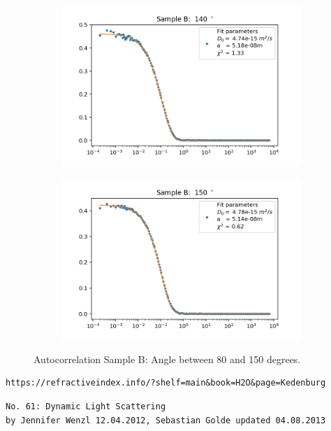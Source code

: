 \documentclass[]{article}
\begin{document}
\begin{figure}[!h]
\medskip
\begin{subfigure}{0.48\textwidth}
\includegraphics[width=\linewidth]{Plots/B/140.png}
\end{subfigure}
\begin{subfigure}[c]{0.48\linewidth}
\includegraphics[width=\linewidth]{Plots/B/150.png}
\end{subfigure}

\caption{Autocorrelation Sample B: Angle between 80 and 150 degrees.}
\end{figure}


\newpage
\begin{thebibliography}{}

 \begin{verbatim}
https://refractiveindex.info/?shelf=main&book=H2O&page=Kedenburg
\end{verbatim}
 \begin{verbatim}
No. 61: Dynamic Light Scattering
by Jennifer Wenzl 12.04.2012, Sebastian Golde updated 04.08.2013
\end{verbatim}

\end{thebibliography}
\end{document}
